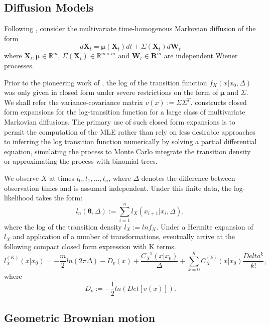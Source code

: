 \documentclass{article}
\newcommand{\be}{\begin{equation}}
\newcommand{\ee}{\end{equation}}
\begin{document}
\subsection{Diffusion Models}

Following \cite{Sahalia2002}, consider the multivariate time-homogenous Markovian diffusion of the form
\be
d\mathbf{X}_t=\mathbf{\mu}(\mathbf{X}_t)dt + \Sigma(\mathbf{X}_t)d\mathbf{W}_t
\ee
where $\mathbf{X}_t, \mathbf{\mu} \in \mathbb{R}^m$, $\Sigma(\mathbf{X}_t)\in\mathbb{R}^{m\times m}$ and $\mathbf{W}_t\in \mathbf{R}^m$ are independent Wiener processes.

Prior to the pioneering work of \cite{Sahalia2002}, the log of the transition function $f_X(x|x_0, \Delta)$ was only given in closed form under severe restrictions on the form of $\mathbf{\mu}$ and $\Sigma$. We shall refer the variance-covariance matrix $v(x):=\Sigma\Sigma^T$. \cite{Sahalia2002} constructs closed form expansions for the log-transition function for a large class of multivariate Markovian diffusions. The primary use of such closed form expansions is to permit the computation of the MLE rather than rely on less desirable approaches to inferring the log transition function numerically by solving a partial differential equation, simulating the process to Monte
Carlo integrate the transition density or approximating the process with binomial trees.

We observe $X$ at times $t_0,t_1,\dots,t_n$, where $\Delta$ denotes the difference between observation times and is assumed independent. Under this finite data, the log-likelihood takes the form:
\be
l_n(\mathbf{\theta}, \Delta) :=\sum_{i=1}^n l_X(x_{i+1}|x_i, \Delta),
\ee
where the log of the transition density $l_X:= ln f_X$. Under a Hermite expansion of $l_X$ and application of a number of transformations, \cite{Sahalia2002} eventually arrive at the following compact closed form expression with K terms.
\be
l^(K)_X(x|x_0) = -\frac{m}{2} ln(2\pi\Delta) - D_v(x) + \frac{C_X^{-1}(x|x_0)}{\Delta} + \sum_{k=0}^K C_X^{(k)}(x|x_0)\frac{Delta^k}{k!},
\label{eq:likelihood}
\ee
where
\be
D_v:=-\frac{1}{2}ln(Det[v(x)]).
\ee




\subsection{Geometric Brownian motion}
\end{document}
